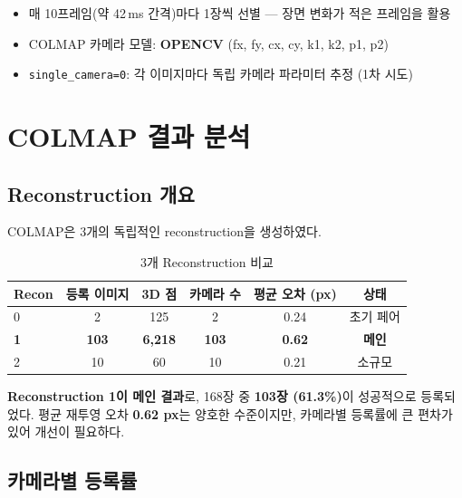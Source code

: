 \documentclass[11pt, a4paper]{report}
\begin{document}
\begin{itemize}[leftmargin=*]
  \item 매 10프레임(약 42\,ms 간격)마다 1장씩 선별 --- 장면 변화가 적은 프레임을 활용
  \item COLMAP 카메라 모델: \textbf{OPENCV} (fx, fy, cx, cy, k1, k2, p1, p2)
  \item \texttt{single\_camera=0}: 각 이미지마다 독립 카메라 파라미터 추정 (1차 시도)
\end{itemize}


\chapter{COLMAP 결과 분석}

\section{Reconstruction 개요}

COLMAP은 3개의 독립적인 reconstruction을 생성하였다.

\begin{table}[H]
\centering
\caption{3개 Reconstruction 비교}
\renewcommand{\arraystretch}{1.3}
\begin{tabular}{lccccc}
\toprule
\textbf{Recon} & \textbf{등록 이미지} & \textbf{3D 점} & \textbf{카메라 수} & \textbf{평균 오차 (px)} & \textbf{상태} \\
\midrule
0 & 2 & 125 & 2 & 0.24 & 초기 페어 \\
\textbf{1} & \textbf{103} & \textbf{6,218} & \textbf{103} & \textbf{0.62} & \textbf{메인} \\
2 & 10 & 60 & 10 & 0.21 & 소규모 \\
\bottomrule
\end{tabular}
\end{table}

\begin{keyidea}
\textbf{Reconstruction 1이 메인 결과}로, 168장 중 \textbf{103장 (61.3\%)}이 성공적으로 등록되었다.
평균 재투영 오차 \textbf{0.62 px}는 양호한 수준이지만,
카메라별 등록률에 큰 편차가 있어 개선이 필요하다.
\end{keyidea}


\section{카메라별 등록률}
\end{document}
